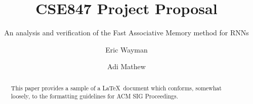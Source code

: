 \documentclass[siggraph, review=false]{acmart}
\begin{document}
\title{CSE847 Project Proposal}
\subtitle{An analysis and verification of the Fast Associative Memory method for RNNs}

\author{Eric Wayman}

\author{Adi Mathew}

\begin{abstract}
This paper provides a sample of a \LaTeX\ document which conforms,
somewhat loosely, to the formatting guidelines for ACM SIG Proceedings. 
\end{abstract}


\maketitle

% 




 
\end{document}
